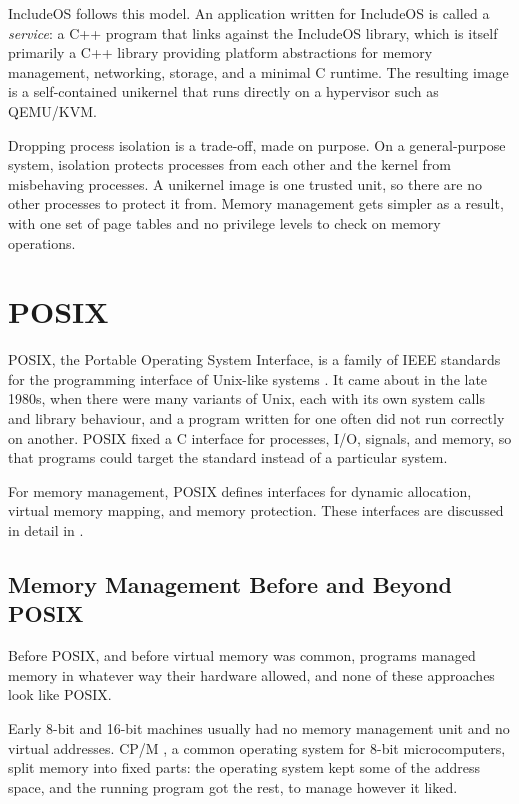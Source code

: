 \documentclass[12pt]{report}
\newcommand{\fullref}[1]{\Cref{#1}}
\renewcommand{\_}{\origunderscore\allowbreak}
\begin{document}
IncludeOS \cite{bratterud2015includeos, bratterud2016includeos-cppcon, bratterud2017deconstructing} follows this model. An application written for IncludeOS is called a \emph{service}: a C++ program that links against the IncludeOS library, which is itself primarily a C++ library providing platform abstractions for memory management, networking, storage, and a minimal C runtime. The resulting image is a self-contained unikernel that runs directly on a hypervisor such as QEMU/KVM.

Dropping process isolation is a trade-off, made on purpose. On a general-purpose system, isolation protects processes from each other and the kernel from misbehaving processes. A unikernel image is one trusted unit, so there are no other processes to protect it from. Memory management gets simpler as a result, with one set of page tables and no privilege levels to check on memory operations.

\section{POSIX}
\label{sec:posix}

POSIX, the Portable Operating System Interface, is a family of IEEE standards for the programming interface of Unix-like systems \cite{posix2017}. It came about in the late 1980s, when there were many variants of Unix, each with its own system calls and library behaviour, and a program written for one often did not run correctly on another. POSIX fixed a C interface for processes, I/O, signals, and memory, so that programs could target the standard instead of a particular system.

For memory management, POSIX defines interfaces for dynamic allocation, virtual memory mapping, and memory protection. These interfaces are discussed in detail in \fullref{sssec:posix-memory}.

\subsection{Memory Management Before and Beyond POSIX}

Before POSIX, and before virtual memory was common, programs managed memory in whatever way their hardware allowed, and none of these approaches look like POSIX.

Early 8-bit and 16-bit machines usually had no memory management unit and no virtual addresses. CP/M \cite{digitalresearch1982cpm}, a common operating system for 8-bit microcomputers, split memory into fixed parts: the operating system kept some of the address space, and the running program got the rest, to manage however it liked.
\end{document}
